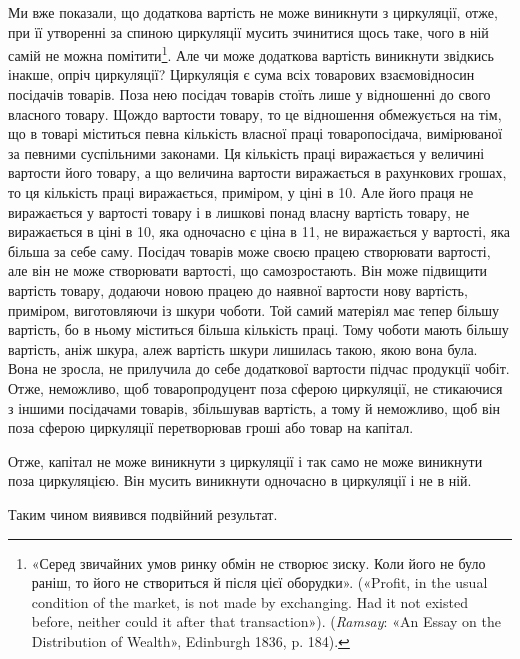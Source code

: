 Ми вже показали, що додаткова вартість не може виникнути
з циркуляції, отже, при її утворенні за спиною циркуляції мусить
зчинитися щось таке, чого в ній самій не можна помітити\footnote{
«Серед звичайних умов ринку обмін не створює зиску. Коли його
не було раніш, то його не створиться й після цієї оборудки». («Profit, in
the usual condition of the market, is not made by exchanging. Had it not
existed before, neither could it after that transaction»). (\emph{Ramsay}: «An
Essay on the Distribution of Wealth», Edinburgh 1836, p. 184).
}. Але
чи може додаткова вартість виникнути звідкись інакше, опріч
циркуляції? Циркуляція є сума всіх товарових взаємовідносин
посідачів товарів. Поза нею посідач товарів стоїть лише у відношенні
до свого власного товару. Щождо вартости товару, то це
відношення обмежується на тім, що в товарі міститься певна
кількість власної праці товаропосідача, вимірюваної за певними
суспільними законами. Ця кількість праці виражається у величині
вартости його товару, а що величина вартости виражається
в рахункових грошах, то ця кількість праці виражається, приміром,
у ціні в 10. Але його праця не виражається
у вартості товару і в лишкові понад власну вартість товару,
не виражається в ціні в 10, яка одночасно є ціна в 11, не виражається
у вартості, яка більша за себе саму. Посідач товарів
може своєю працею створювати вартості, але він не може створювати
вартості, що самозростають. Він може підвищити вартість
товару, додаючи новою працею до наявної вартости нову вартість,
приміром, виготовляючи із шкури чоботи. Той самий матеріял
має тепер більшу вартість, бо в ньому міститься більша кількість
праці. Тому чоботи мають більшу вартість, аніж шкура, алеж вартість
шкури лишилась такою, якою вона була. Вона не зросла,
не прилучила до себе додаткової вартости підчас продукції чобіт.
Отже, неможливо, щоб товаропродуцент поза сферою циркуляції,
не стикаючися з іншими посідачами товарів, збільшував вартість,
а тому й неможливо, щоб він поза сферою циркуляції перетворював
гроші або товар на капітал.

Отже, капітал не може виникнути з циркуляції і так само не
може виникнути поза циркуляцією. Він мусить виникнути одночасно
в циркуляції і не в ній.

Таким чином виявився подвійний результат.

